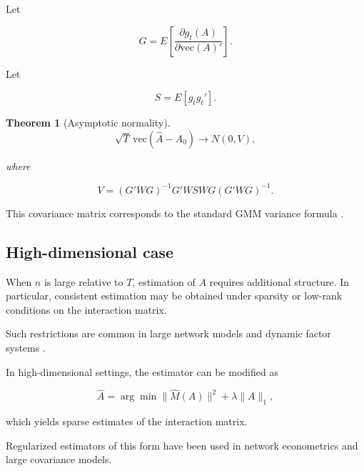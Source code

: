 \documentclass[12pt]{article}
\numberwithin{equation}{section}
\newtheorem{theorem}{Theorem}[section]
\begin{document}
Let

\begin{equation}
G
=
E
\left[
\frac{\partial g_t(A)}{\partial \mathrm{vec}(A)'}
\right].
\label{eq:5.G}
\end{equation}

Let

\begin{equation}
S
=
E[g_t g_t'].
\label{eq:5.S}
\end{equation}

\begin{theorem}[Asymptotic normality]

\begin{equation}
\sqrt{T}
\,
\mathrm{vec}(\hat A - A_0)
\to
N(0, V),
\label{eq:5.normal}
\end{equation}

where

\begin{equation}
V
=
(G' W G)^{-1}
G' W S W G
(G' W G)^{-1}.
\label{eq:5.V}
\end{equation}

\end{theorem}

This covariance matrix corresponds to the standard GMM variance formula
\citep{hansen1982gmm}.

\subsection{High-dimensional case}

When $n$ is large relative to $T$, estimation of $A$ requires additional
structure. In particular, consistent estimation may be obtained under
sparsity or low-rank conditions on the interaction matrix.

Such restrictions are common in large network models and dynamic factor
systems \citep{bai2003inferential, fan2016overview, chandrasekhar2016econometrics}.

In high-dimensional settings, the estimator can be modified as

\begin{equation}
\hat A
=
\arg\min
\|
\hat M(A)
\|^2
+
\lambda
\|A\|_1,
\label{eq:5.lasso}
\end{equation}

which yields sparse estimates of the interaction matrix.

Regularized estimators of this form have been used in network econometrics
and large covariance models.

\end{document}
